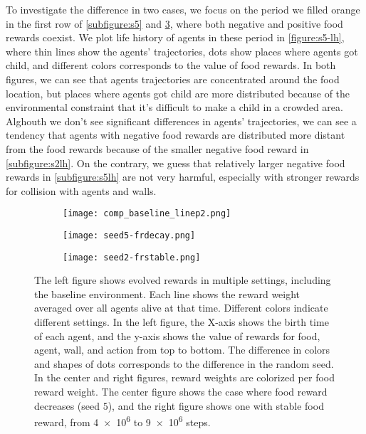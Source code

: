 To investigate the difference in two cases, we focus on the period we filled orange in the first row of \cref{subfigure:s5} and \cref{subfigure:s2}, where both negative and positive food rewards coexist. We plot life history of agents in these period in \cref{figure:s5-lh}, where thin lines show the agents' trajectories, dots show places where agents got child, and different colors corresponds to the value of food rewards. In both figures, we can see that agents trajectories are concentrated around the food location, but places where agents got child are more distributed because of the environmental constraint that it's difficult to make a child in a crowded area.
Alghouth we don't see significant differences in agents' trajectories, we can see a tendency that agents with negative food rewards are distributed more distant from the food rewards because of the smaller negative food reward in \cref{subfigure:s2lh}. On the contrary, we guess that relatively larger negative food rewards in \cref{subfigure:s5lh} are not very harmful, especially with stronger rewards for collision with agents and walls.

\begin{figure}[t]
  \begin{subfigure}[t]{6cm}
    \centering
    \texttt{[image: comp\_baseline\_linep2.png]}
    \label{subfigure:blcomp}
  \end{subfigure}
  \begin{subfigure}[t]{4.5cm}
    \centering
    \texttt{[image: seed5-frdecay.png]}
    \label{subfigure:s4.5}
  \end{subfigure}
  \begin{subfigure}[t]{4.5cm}
    \centering
    \texttt{[image: seed2-frstable.png]}
    \label{subfigure:s2}
  \end{subfigure}
  \caption{
    The left figure shows evolved rewards in multiple settings, including the baseline environment.
    Each line shows the reward weight averaged over all agents alive at that time.
    Different colors indicate different settings.
    In the left figure, the X-axis shows the birth time of each agent, and the y-axis shows the value of rewards for food, agent, wall, and action from top to bottom. The difference in colors and shapes of dots corresponds to the difference in the random seed. In the center and right figures, reward weights are colorized per food reward weight. The center figure shows the case where food reward decreases (seed $5$), and the right figure shows one with stable food reward,  from \num{4e6} to \num{9e6} steps.
  }\label{figure:baseline-result}
\end{figure}

